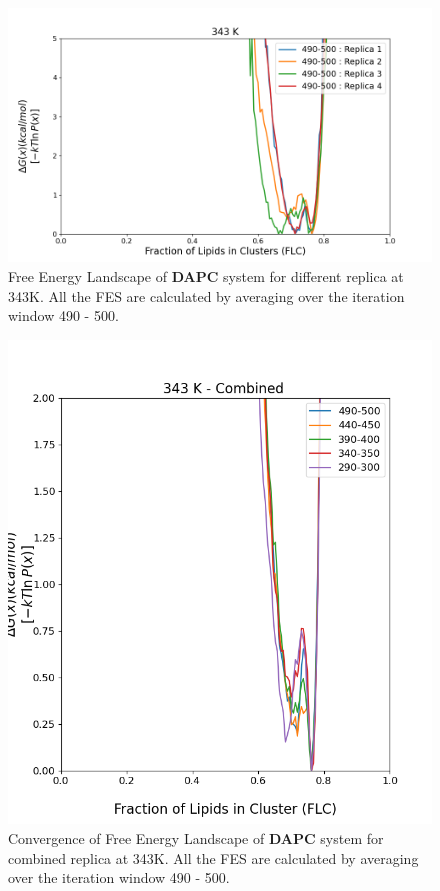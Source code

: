 \documentclass{biophys-new}
\begin{document}

\begin{figure}[hbt!]
\centering
\includegraphics[width=1.1\linewidth]{all_plots/ClusterLipids2Total/DPPC_DAPC_CHOL/343K/Average_DAPC_343_ClusterLipids2Total.png}
\caption{Free Energy Landscape of \textbf{DAPC} system for different replica at 343K. All the FES are calculated by averaging over the iteration window 490 - 500.}
\label{fig:view}

\end{figure}

\begin{figure}[hbt!]
\centering
\includegraphics[width=0.6\linewidth]{all_plots/ClusterLipids2Total/DPPC_DAPC_CHOL/343K/Convergence_DAPC_MULTI__343_ClusterLipids2Total.png}
\caption{Convergence of Free Energy Landscape of \textbf{DAPC} system for combined replica at 343K. All the FES are calculated by averaging over the iteration window 490 - 500.}
\label{fig:view}

\end{figure}
\end{document}
